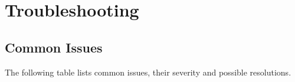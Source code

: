 \part{Troubleshooting} \label{Troubleshooting}

\chapter{Common Issues} \label{Common Issues}

The following table lists common issues, their severity and possible
resolutions.

